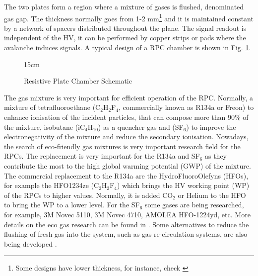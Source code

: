The two plates form a region where a mixture of gases is flushed, denominated gas gap. The thickness normally goes from 1-2 mm\footnote{Some designs have lower thickness, for instance, check \cite{Deppner:2016yku}} and it is maintained constant by a network of spacers distributed throughout the plane. The signal readout is independent of the HV, it can be performed by copper strips or pads where the avalanche induces signals. A typical design of a RPC chamber is shown in Fig. \ref{fig:RPC_schematic}.

\begin{figure}[!htm]{15cm} %
\caption{Resistive Plate Chamber Schematic}%
\label{fig:RPC_schematic}
\end{figure}

The gas mixture is very important for efficient operation of the RPC. Normally, a mixture of tetraﬂuoroethane (C$_2$H$_2$F$_4$, commercially known as R134a or Freon) to enhance ionisation of the incident particles, that can compose more than 90\% of the mixture, isobutane (iC$_4$H$_10$) as a quencher gas and (SF$_6$) to improve the electronegativity of the mixture and reduce the secondary ionisation. Nowadays, the search of eco-friendly gas mixtures is very important research field for the RPCs. The replacement is very important for the R134a and SF$_6$ as they contribute the most to the high global warming potential (GWP) of the mixture. The commercial replacement to the R134a are the HydroFluoroOlefyns (HFOs), for example the HFO1234ze (C$_2$H$_2$F$_4$) which brings the HV working point (WP) of the RPCs to higher values. Normally, it is added CO$_2$ or Helium to the HFO to bring the WP to a lower level. For the SF$_6$ some gases are being researched, for example, 3M Novec 5110, 3M Novec 4710, AMOLEA HFO-1224yd, etc. More details on the eco gas research can be found in \cite{Guida:2022pyg}. Some alternatives to reduce the flushing of fresh gas into the system, such as gas re-circulation systems, are also being developed \cite{Corbetta:2020esl}.

